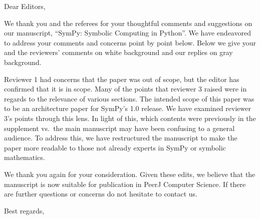 \documentclass{letter}
\date{September 31, 2016} %
\begin{document}
\begin{letter}{}
\opening{Dear Editors,}

We thank you and the referees for your thoughtful comments and suggestions on
our manuscript, ``SymPy: Symbolic Computing in Python''. We have endeavored to
address your comments and concerns point by point below. Below we give your
and the reviewers' comments on white background and our replies on gray
background.

Reviewer 1 had concerns that the paper was out of scope, but the editor has
confirmed that it is in scope. Many of the points that reviewer 3 raised were
in regards to the relevance of various sections. The intended scope of this
paper was to be an architecture paper for SymPy's 1.0 release. We have
examined reviewer 3's points through this lens. In light of this, which
contents were previously in the supplement vs.\ the main manuscript may have
been confusing to a general audience. To address this, we have restructured
the manuscript to make the paper more readable to those not already experts in
SymPy or symbolic mathematics.

We thank you again for your consideration. Given these edits, we believe that
the manuscript is now suitable for publication in PeerJ Computer Science. If
there are further questions or concerns do not hesitate to contact us.

\closing{Best regards,\\
 \\
}

\end{letter}
\end{document}
